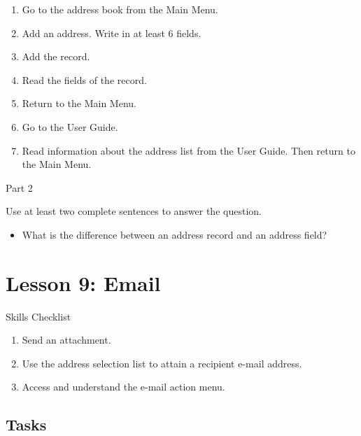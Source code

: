 \documentclass[10pt,letterpaper,twoside]{report}
\begin{document}
{{{{\begin{enumerate}
	\item Go to the address book from the Main Menu.
	      
	\item Add an address.  Write in at least 6 fields.
	      
	\item Add the record.
	      
	\item Read the fields of the record.
	      
	\item Return to the Main Menu.
	      
	\item Go to the User Guide.
	      
	\item Read information about the address list from the User Guide.  Then return to the Main Menu.
\end{enumerate}



Part 2



Use at least two complete sentences to answer the question.



\begin{itemize}
	\item What is the difference between an address record and an address field?
\end{itemize}

\section*{Lesson 9: Email}


Skills Checklist



\begin{enumerate}
	\item Send an attachment.
	      
	\item Use the address selection list to attain a recipient e-mail address.
	      
	\item Access and understand the e-mail action menu.
\end{enumerate}



 \subsection{Tasks}



}}}}
\end{document}
